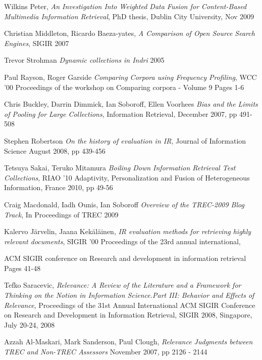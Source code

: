\begin{thebibliography}{99}
			Wilkins Peter,
			\emph{An Investigation Into Weighted Data Fusion for Content-Based Multimedia Information Retrieval},
			PhD thesis,
			Dublin City University,
			Nov 2009


			Christian Middleton, Ricardo Baeza-yates,
			\emph{A Comparison of Open Source Search Engines},
			SIGIR 2007

			Trevor Strohman
			\emph{Dynamic collections in Indri}
			2005


			Paul Rayson, Roger Garside
			\emph{Comparing Corpora using Frequency Profiling},
			WCC '00 Proceedings of the workshop on Comparing corpora - Volume 9
			Pages 1-6

			Chris Buckley, Darrin Dimmick, Ian Soboroff, Ellen Voorhees
			\emph{Bias and the Limits of Pooling for Large Collections},
			Information Retrieval,
			December 2007,
			pp 491-508

			Stephen Robertson
			\emph{On the history of evaluation in IR},
			Journal of Information Science
			August 2008,
			pp 439-456

			Tetsuya Sakai, Teruko Mitamura
			\emph{Boiling Down Information Retrieval Test Collections},
			RIAO '10 Adaptivity, Personalization and Fusion of Heterogeneous Information,
			France 2010,
			pp 49-56

			Craig Macdonald, Iadh Ounis, Ian Soboroff
			\emph{Overview of the TREC-2009 Blog Track},
			In Proceedings of TREC 2009

			Kalervo Järvelin, Jaana Kekäläinen,
			\emph{IR evaluation methods for retrieving highly relevant documents},
			SIGIR '00 Proceedings of the 23rd annual international,

			ACM SIGIR conference on Research and development in information retrieval
			Pages 41-48

			Tefko Saracevic,
			\emph{Relevance: A Review of the Literature and a Framework for Thinking on the Notion in Information Science.Part III: Behavior and Effects of Relevance},
			Proceedings of the 31st Annual International ACM SIGIR Conference on Research and Development in Information Retrieval,
			SIGIR 2008, Singapore,
			July 20-24, 2008

			Azzah Al-Maskari, Mark Sanderson, Paul Clough,
			\emph{Relevance Judgments between TREC and Non-TREC Assessors}
			November 2007,
			pp 2126 - 2144


\end{thebibliography}
